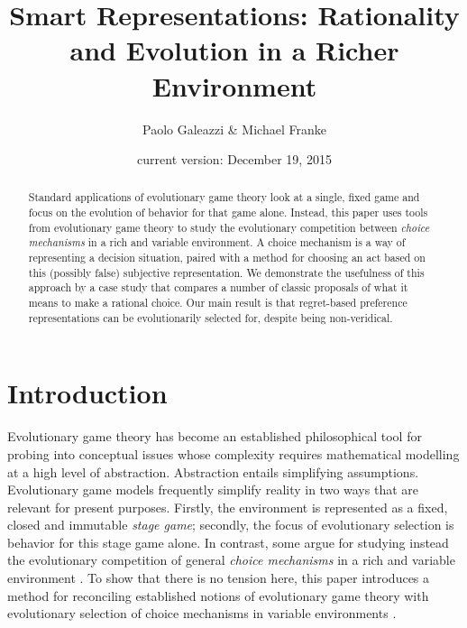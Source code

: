\documentclass[fleqn,reqno,11pt]{article}
\title{Smart Representations: {R}ationality and Evolution in a Richer  Environment}
\author{Paolo Galeazzi \& Michael Franke} \date{current version: December 19, 2015}
\begin{document}
\maketitle

\begin{abstract}
  Standard applications of evolutionary game theory look at a single, fixed game and focus on
  the evolution of behavior for that game alone. Instead, this paper uses tools from
  evolutionary game theory to study the evolutionary competition between \emph{choice
    mechanisms} in a rich and variable environment. A choice mechanism is a way of representing
  a decision situation, paired with a method for choosing an act based on this (possibly false)
  subjective representation. We demonstrate the usefulness of this approach by a case study
  that compares a number of classic proposals of what it means to make a rational choice. Our
  main result is that regret-based preference representations can be evolutionarily selected
  for, despite being non-veridical.
\end{abstract}

\section{Introduction}
\label{sec:intr--motiv}


Evolutionary game theory has become an established philosophical tool for probing into
conceptual issues whose complexity requires mathematical modelling at a high level of
abstraction.  Abstraction entails simplifying assumptions. Evolutionary game models frequently
simplify reality in two ways that are relevant for present purposes. Firstly, the environment
is represented as a fixed, closed and immutable \emph{stage game}; secondly, the focus of
evolutionary selection is behavior for this stage game alone. In contrast, some argue for
studying instead the evolutionary competition of general \emph{choice mechanisms} in a rich and
variable environment
\citep[e.g.,][]{FawcettHamblin2013:Exposing-the-be,McNamara2013:Towards-a-Riche}. To show that
there is no tension here, this paper introduces a method for reconciling established notions of
evolutionary game theory with evolutionary selection of choice mechanisms in variable
environments \citep[see related work
by][]{ZollmanSmead2010:Plasticity-and-,SmeadZollman2013:The-Stability-o}.
\end{document}
